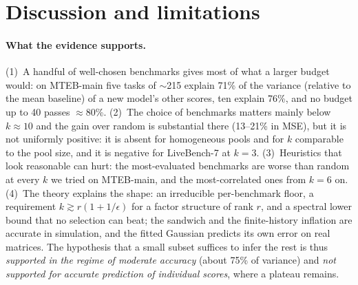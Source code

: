 \section{Discussion and limitations}
\label{sec:disc}

\paragraph{What the evidence supports.}
(1)~A handful of well-chosen benchmarks gives most of what a larger budget would: on MTEB-main five tasks of $\sim$215 explain 71\% of the variance (relative to the mean baseline) of a new model's other scores, ten explain 76\%, and no budget up to 40 passes $\approx$80\%. (2)~The choice of benchmarks matters mainly below $k\approx10$ and the gain over random is substantial there (13--21\% in MSE), but it is not uniformly positive: it is absent for homogeneous pools and for $k$ comparable to the pool size, and it is negative for LiveBench-7 at $k=3$. (3)~Heuristics that look reasonable can hurt: the most-evaluated benchmarks are worse than random at every $k$ we tried on MTEB-main, and the most-correlated ones from $k=6$ on. (4)~The theory explains the shape: an irreducible per-benchmark floor, a requirement $k\gtrsim r(1+1/\epsilon)$ for a factor structure of rank $r$, and a spectral lower bound that no selection can beat; the sandwich and the finite-history inflation are accurate in simulation, and the fitted Gaussian predicts its own error on real matrices. The hypothesis that a small subset suffices to infer the rest is thus \emph{supported in the regime of moderate accuracy} (about 75\% of variance) and \emph{not supported for accurate prediction of individual scores}, where a plateau remains.

